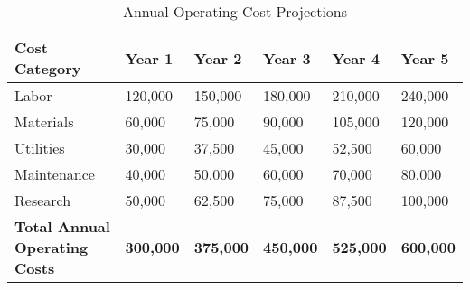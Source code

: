 \begin{table}[h]
\centering
\begin{tabular}{p{}p{}p{}p{}p{}p{}}
\hline
\textbf{Cost Category} & \textbf{Year 1} & \textbf{Year 2} & \textbf{Year 3} & \textbf{Year 4} & \textbf{Year 5} \\
\hline
Labor & 120,000 & 150,000 & 180,000 & 210,000 & 240,000 \\
Materials & 60,000 & 75,000 & 90,000 & 105,000 & 120,000 \\
Utilities & 30,000 & 37,500 & 45,000 & 52,500 & 60,000 \\
Maintenance & 40,000 & 50,000 & 60,000 & 70,000 & 80,000 \\
Research & 50,000 & 62,500 & 75,000 & 87,500 & 100,000 \\
\hline
\textbf{Total Annual Operating Costs} & \textbf{300,000} & \textbf{375,000} & \textbf{450,000} & \textbf{525,000} & \textbf{600,000} \\
\hline
\end{tabular}
\caption{Annual Operating Cost Projections}
\end{table}

